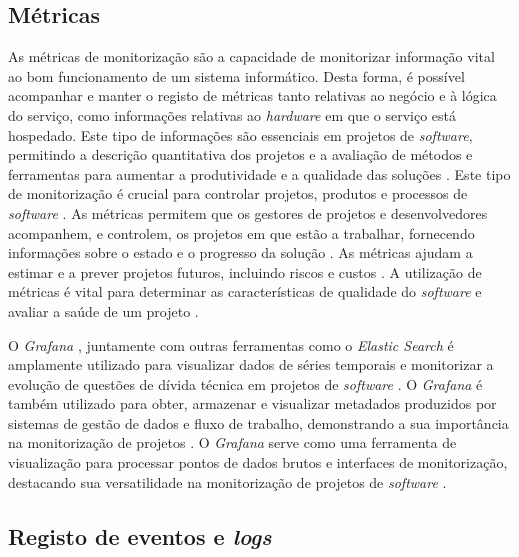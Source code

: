 \subsection{Métricas}

As métricas de monitorização são a capacidade de monitorizar informação vital ao bom funcionamento
de um sistema informático. Desta forma, é possível acompanhar e manter o registo de métricas tanto
relativas ao negócio e à lógica do serviço, como informações relativas ao \textit{hardware} em que
o serviço está hospedado. Este tipo de informações são essenciais em projetos de \textit{software}, 
permitindo a descrição quantitativa dos projetos e a avaliação de métodos e ferramentas para 
aumentar a produtividade e a qualidade das soluções \cite{metrics2003}. Este tipo de monitorização 
é crucial para controlar projetos, produtos e processos de \textit{software} \cite{metrics2019}. 
As métricas permitem que os gestores de projetos e desenvolvedores acompanhem, e controlem, os 
projetos em que estão a trabalhar, fornecendo informações sobre o estado e o progresso da solução 
\cite{metrics2016}. As métricas ajudam a estimar e a prever projetos futuros, incluindo riscos e 
custos \cite{metrics2016b}. A utilização de métricas é vital para determinar as características de 
qualidade do \textit{software} e avaliar a saúde de um projeto \cite{metrics2015}.

O \textit{Grafana} \cite{grafana}, juntamente com outras ferramentas como o \textit{Elastic Search}
\cite{elastic-search} é amplamente utilizado para visualizar dados de séries temporais e monitorizar
a evolução de questões de dívida técnica em projetos de \textit{software} \cite{metrics2019b}. O 
\textit{Grafana} é também utilizado para obter, armazenar e visualizar metadados produzidos por 
sistemas de gestão de dados e fluxo de trabalho, demonstrando a sua importância na monitorização 
de projetos \cite{metrics2021}. O \textit{Grafana} serve como uma ferramenta de visualização para 
processar pontos de dados brutos e interfaces de monitorização, destacando sua versatilidade na 
monitorização de projetos de \textit{software} \cite{metrics2022}.

\subsection{Registo de eventos e \textit{logs}}


